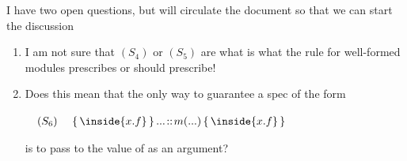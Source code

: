 I have two open questions, but will circulate the document so that we can start the discussion

\begin{enumerate}
\item
I am not sure that  $(S_4)$ or $(S_5)$ are what 
 is what the rule for well-formed modules prescribes or should prescribe!
 \item
 Does this mean that the only way to guarantee a spec of the form 
 
 $\strut \ \ \ (S_6) \ \ \ \ {\mprepostLong 
					 {\inside{x.f}}
					 {...}
					 {m}
					 {...}
					  {\inside{x.f}}
					}$
					
is to pass to  the value of  as an argument?
\end{enumerate}
